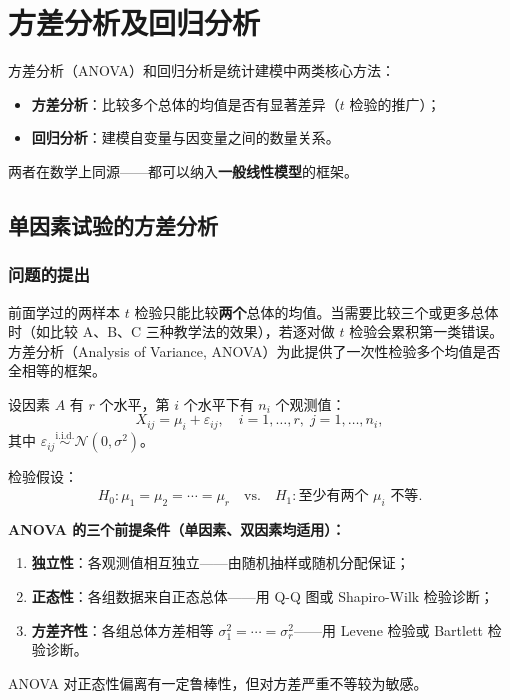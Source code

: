 \chapter{方差分析及回归分析}

方差分析（ANOVA）和回归分析是统计建模中两类核心方法：
\begin{itemize}
    \item \textbf{方差分析}：比较多个总体的均值是否有显著差异（$t$ 检验的推广）；
    \item \textbf{回归分析}：建模自变量与因变量之间的数量关系。
\end{itemize}
两者在数学上同源——都可以纳入\textbf{一般线性模型}的框架。

\section{单因素试验的方差分析}

\subsection{问题的提出}

前面学过的两样本 $t$ 检验只能比较\textbf{两个}总体的均值。当需要比较三个或更多总体时（如比较 A、B、C 三种教学法的效果），若逐对做 $t$ 检验会累积第一类错误。方差分析（Analysis of Variance, ANOVA）为此提供了一次性检验多个均值是否全相等的框架。

\begin{definition}[单因素方差分析模型]
设因素 $A$ 有 $r$ 个水平，第 $i$ 个水平下有 $n_i$ 个观测值：
\begin{equation}
    X_{ij} = \mu_i + \varepsilon_{ij}, \quad i = 1,\dots,r,\; j = 1,\dots,n_i,
\end{equation}
其中 $\varepsilon_{ij} \stackrel{\mathrm{i.i.d.}}{\sim} \mathcal{N}(0, \sigma^2)$。

检验假设：
\begin{equation}
    H_0: \mu_1 = \mu_2 = \cdots = \mu_r \quad \text{vs.} \quad H_1: \text{至少有两个 } \mu_i \text{ 不等}.
\end{equation}
\end{definition}

\textbf{ANOVA 的三个前提条件（单因素、双因素均适用）：}
\begin{enumerate}
    \item \textbf{独立性}：各观测值相互独立——由随机抽样或随机分配保证；
    \item \textbf{正态性}：各组数据来自正态总体——用 Q-Q 图或 Shapiro-Wilk 检验诊断；
    \item \textbf{方差齐性}：各组总体方差相等 $\sigma_1^2 = \cdots = \sigma_r^2$——用 Levene 检验或 Bartlett 检验诊断。
\end{enumerate}
ANOVA 对正态性偏离有一定鲁棒性，但对方差严重不等较为敏感。

